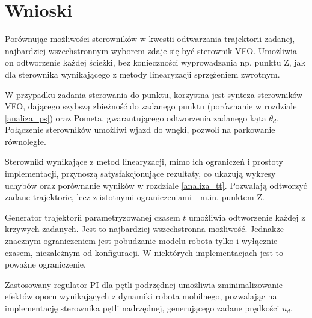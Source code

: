 \documentclass[12pt, a4paper, polish]{article}
\begin{document}
\section{Wnioski}
Porównując możliwości sterowników w kwestii odtwarzania trajektorii zadanej, najbardziej wszechstronnym wyborem zdaje się być sterownik VFO. Umożliwia on odtworzenie każdej ścieżki, bez konieczności wyprowadzania np. punktu Z, jak dla sterownika wynikającego z metody linearyzacji sprzężeniem zwrotnym. 

W przypadku zadania sterowania do punktu, korzystna jest synteza sterowników VFO, dającego szybszą zbieżność do zadanego punktu (porównanie w rozdziale \ref{analiza_ps}) oraz Pometa, gwarantującego odtworzenia zadanego kąta $\theta_d$. Połączenie sterowników umożliwi wjazd do wnęki, pozwoli na parkowanie równoległe.

Sterowniki wynikające z metod linearyzacji, mimo ich ograniczeń i prostoty implementacji, przynoszą satysfakcjonujące rezultaty, co ukazują wykresy uchybów oraz porównanie wyników w rozdziale \ref{analiza_tt}. Pozwalają odtworzyć zadane trajektorie, lecz z istotnymi ograniczeniami - m.in. punktem Z.

Generator trajektorii parametryzowanej czasem $t$ umożliwia odtworzenie każdej z krzywych zadanych. Jest to najbardziej wszechstronna możliwość. Jednakże znacznym ograniczeniem jest pobudzanie modelu robota tylko i wyłącznie czasem, niezależnym od konfiguracji. W niektórych implementacjach jest to poważne ograniczenie.

Zastosowany regulator PI dla pętli podrzędnej umożliwia zminimalizowanie efektów oporu wynikających z dynamiki robota mobilnego, pozwalając na implementację sterownika pętli nadrzędnej, generującego zadane prędkości $u_d$.
\end{document}
